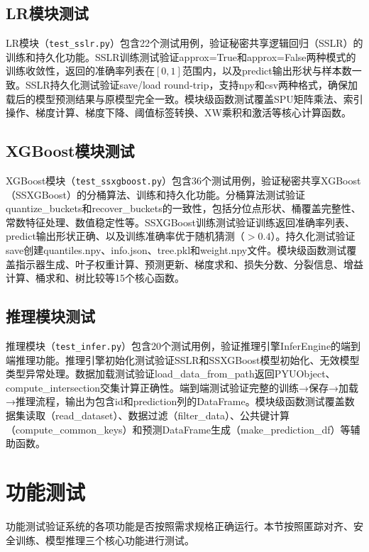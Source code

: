 \subsection{LR模块测试}

LR模块（\texttt{test\_sslr.py}）包含22个测试用例，验证秘密共享逻辑回归（SSLR）的训练和持久化功能。SSLR训练测试验证approx=True和approx=False两种模式的训练收敛性，返回的准确率列表在$[0,1]$范围内，以及predict输出形状与样本数一致。SSLR持久化测试验证save/load round-trip，支持npy和csv两种格式，确保加载后的模型预测结果与原模型完全一致。模块级函数测试覆盖SPU矩阵乘法、索引操作、梯度计算、梯度下降、阈值标签转换、XW乘积和激活等核心计算函数。

\subsection{XGBoost模块测试}

XGBoost模块（\texttt{test\_ssxgboost.py}）包含36个测试用例，验证秘密共享XGBoost（SSXGBoost）的分桶算法、训练和持久化功能。分桶算法测试验证quantize\_buckets和recover\_buckets的一致性，包括分位点形状、桶覆盖完整性、常数特征处理、数值稳定性等。SSXGBoost训练测试验证训练返回准确率列表、predict输出形状正确、以及训练准确率优于随机猜测（$>0.4$）。持久化测试验证save创建quantiles.npy、info.json、tree.pkl和weight.npy文件。模块级函数测试覆盖指示器生成、叶子权重计算、预测更新、梯度求和、损失分数、分裂信息、增益计算、桶求和、树比较等15个核心函数。

\subsection{推理模块测试}

推理模块（\texttt{test\_infer.py}）包含20个测试用例，验证推理引擎InferEngine的端到端推理功能。推理引擎初始化测试验证SSLR和SSXGBoost模型初始化、无效模型类型异常处理。数据加载测试验证load\_data\_from\_path返回PYUObject、compute\_intersection交集计算正确性。端到端测试验证完整的训练→保存→加载→推理流程，输出为包含id和prediction列的DataFrame。模块级函数测试覆盖数据集读取（read\_dataset）、数据过滤（filter\_data）、公共键计算（compute\_common\_keys）和预测DataFrame生成（make\_prediction\_df）等辅助函数。

\section{功能测试}
\label{sec:func-test}

功能测试验证系统的各项功能是否按照需求规格正确运行。本节按照匿踪对齐、安全训练、模型推理三个核心功能进行测试。

